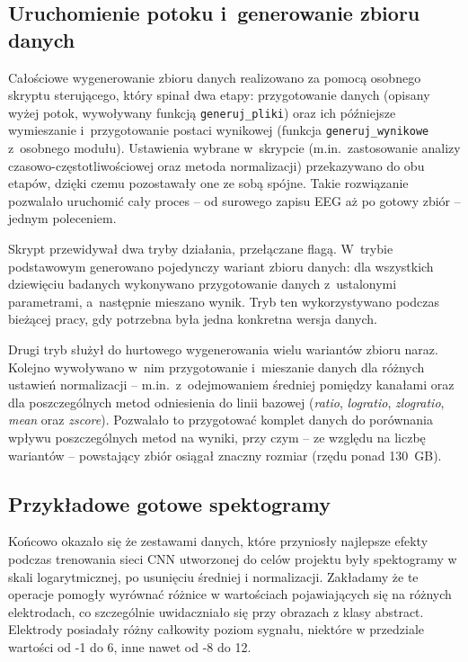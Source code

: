 \documentclass[12pt,a4paper,numbers=enddot,headings=small]{scrartcl} %
\begin{document}
	\subsection{Uruchomienie potoku i~generowanie zbioru danych}
	
	Całościowe wygenerowanie zbioru danych realizowano za pomocą osobnego skryptu
	sterującego, który spinał dwa etapy: przygotowanie danych (opisany wyżej
	potok, wywoływany funkcją \texttt{generuj\_pliki}) oraz ich późniejsze
	wymieszanie i~przygotowanie postaci wynikowej (funkcja
	\texttt{generuj\_wynikowe} z~osobnego modułu). Ustawienia wybrane w~skrypcie
	(m.in.~zastosowanie analizy czasowo-częstotliwościowej oraz metoda
	normalizacji) przekazywano do obu etapów, dzięki czemu pozostawały one ze
	sobą spójne. Takie rozwiązanie pozwalało uruchomić cały proces -- od surowego
	zapisu EEG aż po gotowy zbiór -- jednym poleceniem.
	
	Skrypt przewidywał dwa tryby działania, przełączane flagą. W~trybie
	podstawowym generowano pojedynczy wariant zbioru danych: dla wszystkich
	dziewięciu badanych wykonywano przygotowanie danych z~ustalonymi parametrami,
	a~następnie mieszano wynik. Tryb ten wykorzystywano podczas bieżącej pracy,
	gdy potrzebna była jedna konkretna wersja danych.
	
	Drugi tryb służył do hurtowego wygenerowania wielu wariantów zbioru naraz.
	Kolejno wywoływano w~nim przygotowanie i~mieszanie danych dla różnych ustawień
	normalizacji -- m.in.~z~odejmowaniem średniej pomiędzy kanałami oraz dla
	poszczególnych metod odniesienia do linii bazowej (\textit{ratio},
	\textit{logratio}, \textit{zlogratio}, \textit{mean} oraz \textit{zscore}).
	Pozwalało to przygotować komplet danych do porównania wpływu poszczególnych
	metod na wyniki, przy czym -- ze względu na liczbę wariantów -- powstający
	zbiór osiągał znaczny rozmiar (rzędu ponad 130~GB).
	
	\subsection{Przykładowe gotowe spektogramy}
	
	Końcowo okazało się że zestawami danych, które przyniosły najlepsze efekty podczas trenowania sieci CNN utworzonej do celów projektu były spektogramy w skali logarytmicznej, po usunięciu średniej i normalizacji.
	Zakładamy że te operacje pomogły wyrównać różnice w wartościach pojawiających się na różnych elektrodach, co szczególnie uwidaczniało się przy obrazach z klasy abstract. Elektrody posiadały różny całkowity poziom sygnału, niektóre w przedziale wartości od -1 do 6, inne nawet od -8 do 12. 
	
\end{document}
